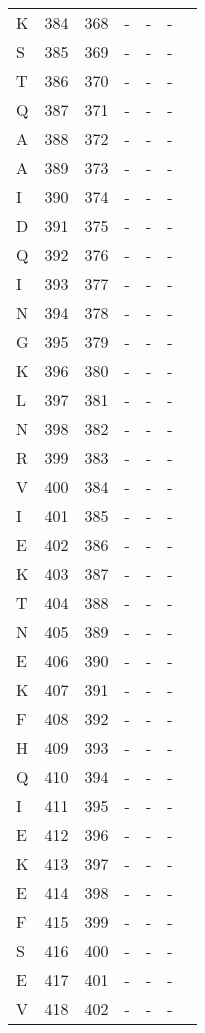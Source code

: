 \begin{longtable}{lllllll}
  K & 384 & 368 & - & - & - &  \\ 
  S & 385 & 369 & - & - & - &  \\ 
  T & 386 & 370 & - & - & - &  \\ 
  Q & 387 & 371 & - & - & - &  \\ 
  A & 388 & 372 & - & - & - &  \\ 
  A & 389 & 373 & - & - & - &  \\ 
  I & 390 & 374 & - & - & - &  \\ 
  D & 391 & 375 & - & - & - &  \\ 
  Q & 392 & 376 & - & - & - &  \\ 
  I & 393 & 377 & - & - & - &  \\ 
  N & 394 & 378 & - & - & - &  \\ 
  G & 395 & 379 & - & - & - &  \\ 
  K & 396 & 380 & - & - & - &  \\ 
  L & 397 & 381 & - & - & - &  \\ 
  N & 398 & 382 & - & - & - &  \\ 
  R & 399 & 383 & - & - & - &  \\ 
  V & 400 & 384 & - & - & - &  \\ 
  I & 401 & 385 & - & - & - &  \\ 
  E & 402 & 386 & - & - & - &  \\ 
  K & 403 & 387 & - & - & - &  \\ 
  T & 404 & 388 & - & - & - &  \\ 
  N & 405 & 389 & - & - & - &  \\ 
  E & 406 & 390 & - & - & - &  \\ 
  K & 407 & 391 & - & - & - &  \\ 
  F & 408 & 392 & - & - & - &  \\ 
  H & 409 & 393 & - & - & - &  \\ 
  Q & 410 & 394 & - & - & - &  \\ 
  I & 411 & 395 & - & - & - &  \\ 
  E & 412 & 396 & - & - & - &  \\ 
  K & 413 & 397 & - & - & - &  \\ 
  E & 414 & 398 & - & - & - &  \\ 
  F & 415 & 399 & - & - & - &  \\ 
  S & 416 & 400 & - & - & - &  \\ 
  E & 417 & 401 & - & - & - &  \\ 
  V & 418 & 402 & - & - & - &  \\ 

\end{longtable}

